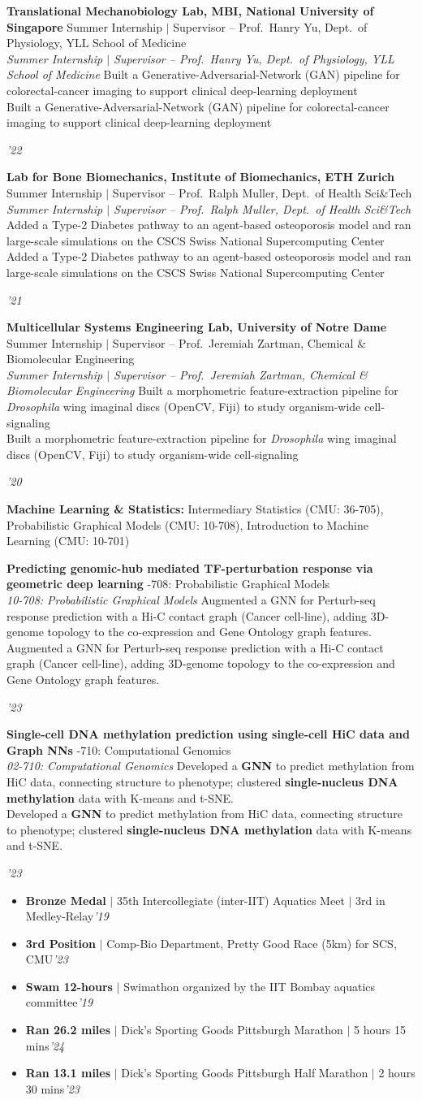 \documentclass[11pt,letterpaper]{article}
\newlength{\cvlabelw}\setlength{\cvlabelw}{1.15in}   %
\newlength{\cvlabelsep}\setlength{\cvlabelsep}{0.15in}%
\newlength{\cvdatew}\setlength{\cvdatew}{1.15in}     %
\newcommand{\cvsection}[1]{%
  \par\addvspace{\baselineskip}\needspace{3\baselineskip}%
  \noindent\llap{\raisebox{0pt}[\height][0pt]{%
    \parbox[t]{\cvlabelw}{\raggedright\normalfont\scshape\bfseries
      \textcolor{sectionpurple}{#1}}}\hspace{\cvlabelsep}}%
  \nopagebreak\ignorespaces}
\newcommand{\dates}[1]{\hfill{\small\textsl{#1}}}
\newcommand{\expentry}[4]{%
  \parbox[t]{\dimexpr\linewidth-\cvdatew-\cvlabelsep\relax}{\raggedright
    \textbf{#1}%
    \ifx\relax#3\relax\else\\[1.5pt]\textsl{#3}\fi
    \ifx\relax#4\relax\else\\[2pt]#4\fi}%
  \hfill
  \parbox[t]{\cvdatew}{\raggedleft\small\textsl{#2}}%
  \par\addvspace{5pt}}
\begin{document}
\expentry{Translational Mechanobiology Lab, MBI, National University of Singapore}{'22}
  {Summer Internship $\mid$ Supervisor -- Prof.\ Hanry Yu, Dept.\ of Physiology, YLL School of Medicine}
  {Built a Generative-Adversarial-Network (GAN) pipeline for colorectal-cancer imaging to support clinical deep-learning deployment}

\expentry{Lab for Bone Biomechanics, Institute of Biomechanics, ETH Zurich}{'21}
  {Summer Internship $\mid$ Supervisor -- Prof.\ Ralph Muller, Dept.\ of Health Sci\&Tech}
  {Added a Type-2 Diabetes pathway to an agent-based osteoporosis model and ran large-scale simulations on the CSCS Swiss National Supercomputing Center}

\expentry{Multicellular Systems Engineering Lab, University of Notre Dame}{'20}
  {Summer Internship $\mid$ Supervisor -- Prof.\ Jeremiah Zartman, Chemical \& Biomolecular Engineering}
  {Built a morphometric feature-extraction pipeline for \emph{Drosophila} wing imaginal discs (OpenCV, Fiji) to study organism-wide cell-signaling}

\cvsection{Key Coursework}%
\textbf{Machine Learning \& Statistics:} Intermediary Statistics (CMU: 36-705), Probabilistic Graphical Models (CMU: 10-708), Introduction to Machine Learning (CMU: 10-701)
\par\addvspace{6.5pt}
\expentry{Predicting genomic-hub mediated TF-perturbation response via geometric deep learning}{'23}
  {10-708: Probabilistic Graphical Models}
  {Augmented a GNN for Perturb-seq response prediction with a Hi-C contact graph (Cancer cell-line), adding 3D-genome topology to the co-expression and Gene Ontology graph features.}

\expentry{Single-cell DNA methylation prediction using single-cell HiC data and Graph NNs}{'23}
  {02-710: Computational Genomics}
  {Developed a \textbf{GNN} to predict methylation from HiC data, connecting structure to phenotype; clustered \textbf{single-nucleus DNA methylation} data with K-means and t-SNE.}

\cvsection{Athletic Accolades}%
\vspace{-1.35\baselineskip}%
\begin{itemize}[label={},leftmargin=0pt]
  \item \textbf{Bronze Medal} $\mid$ 35th Intercollegiate (inter-IIT) Aquatics Meet $\mid$ 3rd in Medley-Relay\dates{'19}
  \item \textbf{3rd Position} $\mid$ Comp-Bio Department, Pretty Good Race (5km) for SCS, CMU\dates{'23}
  \item \textbf{Swam 12-hours} $\mid$ Swimathon organized by the IIT Bombay aquatics committee\dates{'19}
  \item \textbf{Ran 26.2 miles} $\mid$ Dick's Sporting Goods Pittsburgh Marathon $\mid$ 5 hours 15 mins\dates{'24}
  \item \textbf{Ran 13.1 miles} $\mid$ Dick's Sporting Goods Pittsburgh Half Marathon $\mid$ 2 hours 30 mins\dates{'23}
\end{itemize}
\end{document}
